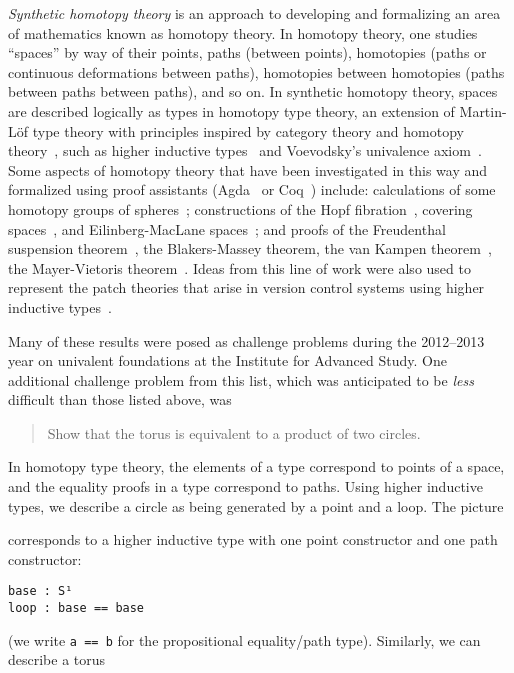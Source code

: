 
\emph{Synthetic homotopy theory} is an approach to developing and
formalizing an area of mathematics known as homotopy theory.  In
homotopy theory, one studies ``spaces'' by way of their points, paths
(between points), homotopies (paths or continuous deformations between
paths), homotopies between homotopies (paths between paths between
paths), and so on.  In synthetic homotopy theory, spaces are described
logically as types in homotopy type theory, an extension of Martin-L\"of
type theory with principles inspired by category theory and homotopy
theory~\citep{hofmann98groupoid,garner09twodim,lumsdaine09omega,vandenberggarner10groupoids,awodeywarren09identity,warren08thesis,gambinogarner08id,voevodsky11wollic,lh122tt},
such as higher inductive
types~\citep{lumsdaine+13hits,shulman11hitsblog,lumsdaine11hitsblog} and
Voevodsky's univalence
axiom~\citep{voevodsky11wollic,voevodsky+12simpluniv}.  Some aspects of
homotopy theory that have been investigated in this way and formalized
using proof assistants (Agda~\citep{norell07thesis} or
Coq~\citep{inria06coqmanual}) include: calculations of some homotopy
groups of spheres~\citep{ls13pi1s1,lb13pinsn,uf13hott-book};
constructions of the Hopf fibration~\citep{uf13hott-book}, covering
spaces~\citep{favonia-types}, and Eilinberg-MacLane
spaces~\citep{lf14emspace}; and proofs of the Freudenthal suspension
theorem~\citep{uf13hott-book}, the Blakers-Massey theorem, the van
Kampen theorem~\citep{uf13hott-book}, the Mayer-Vietoris
theorem~\citep{cavallo}.  Ideas from this line of work were also used to
represent the patch theories that arise in version control systems using
higher inductive types~\citep{amlh14patch}.

Many of these results were posed as challenge problems during the
2012--2013 year on univalent foundations at the Institute for Advanced
Study.  One additional challenge problem from this list, which was
anticipated to be \emph{less} difficult than those listed above, was
\begin{quote}
Show that the torus is equivalent to a product of two circles.
\end{quote}
In homotopy type theory, the elements of a type correspond to points of
a space, and the equality proofs in a type correspond to paths.  Using
higher inductive types, we describe a circle as being generated by a
point and a loop.  The picture
\begin{center}
\end{center}
corresponds to a higher inductive type with one point constructor and
one path constructor:
\begin{verbatim}
base : S¹
loop : base == base
\end{verbatim}
(we write \verb|a == b| for the propositional equality/path type).
Similarly, we can describe a torus

